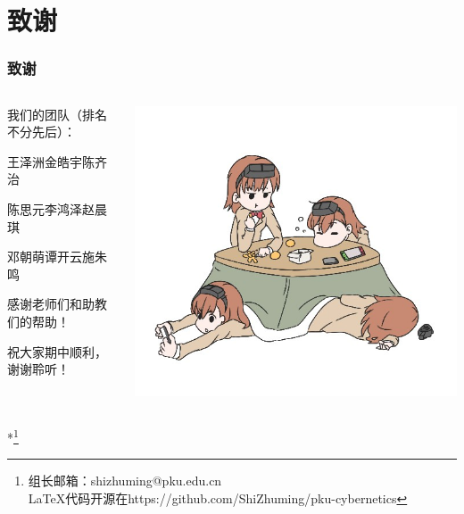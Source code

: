 \documentclass[12pt,AutoFakeBold,aspectratio=43,mathserif]{beamer}
\begin{document}
    \section*{致谢}

    \begin{frame}
        \frametitle{致谢}
        \begin{columns}
            \begin{column}{.5\linewidth}
                我们的团队（排名不分先后）：

                王泽洲\quad 金皓宇\quad 陈齐治
        
                陈思元\quad 李鸿泽\quad 赵晨琪
                
                邓朝萌\quad 谭开云\quad 施朱鸣
            
                \bigskip

                感谢老师们和助教们的帮助！

                祝大家期中顺利，谢谢聆听！
            \end{column}
            \begin{column}{.5\linewidth}
                \includegraphics[width=.4\paperwidth]{figures/misaka558.jpg}
            \end{column}
        \end{columns}
        *\footnote{组长邮箱：shizhuming@pku.edu.cn \\ LaTeX代码开源在https://github.com/ShiZhuming/pku-cybernetics}
    \end{frame}
    
\end{document}
